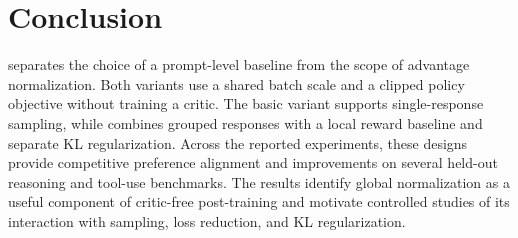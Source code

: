 \section{Conclusion}
\ours separates the choice of a prompt-level baseline from the scope of advantage normalization. Both variants use a shared batch scale and a clipped policy objective without training a critic. The basic variant supports single-response sampling, while \baseline combines grouped responses with a local reward baseline and separate KL regularization. Across the reported experiments, these designs provide competitive preference alignment and improvements on several held-out reasoning and tool-use benchmarks. The results identify global normalization as a useful component of critic-free post-training and motivate controlled studies of its interaction with sampling, loss reduction, and KL regularization.
